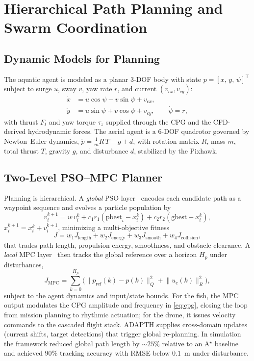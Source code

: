 \documentclass[journal]{IEEEtran}
\begin{document}
\section{Hierarchical Path Planning and Swarm Coordination}
\label{sec:planning}

\subsection{Dynamic Models for Planning}
The aquatic agent is modeled as a planar 3-DOF body with state
$p=[x,\,y,\,\psi]^\top$ subject to surge $u$, sway $v$, yaw rate $r$, and current
$(v_{cx},v_{cy})$:
\begin{align}
\dot{x} &= u\cos\psi - v\sin\psi + v_{cx},\\
\dot{y} &= u\sin\psi + v\cos\psi + v_{cy},\qquad \dot{\psi} = r,
\end{align}
with thrust $F_t$ and yaw torque $\tau_z$ supplied through the CPG and the
CFD-derived hydrodynamic forces. The aerial agent is a 6-DOF quadrotor governed
by Newton--Euler dynamics, $\ddot{p} = \tfrac{1}{m}R\,T - g + d$, with rotation
matrix $R$, mass $m$, total thrust $T$, gravity $g$, and disturbance $d$,
stabilized by the Pixhawk.

\subsection{Two-Level PSO--MPC Planner}
Planning is hierarchical. A \emph{global} PSO layer~\cite{kennedy1995particle}
encodes each candidate path as a waypoint sequence and evolves a particle
population by
\begin{equation}
v_i^{k+1} = w\,v_i^{k} + c_1 r_1(\mathrm{pbest}_i - x_i^{k})
          + c_2 r_2(\mathrm{gbest} - x_i^{k}),
\end{equation}
$x_i^{k+1}=x_i^{k}+v_i^{k+1}$, minimizing a multi-objective fitness
\begin{equation}
J = w_1 J_{\mathrm{length}} + w_2 J_{\mathrm{energy}}
  + w_3 J_{\mathrm{smooth}} + w_4 J_{\mathrm{collision}},
\label{eq:psocost}
\end{equation}
that trades path length, propulsion energy, smoothness, and obstacle clearance.
A \emph{local} MPC layer~\cite{mayne2000constrained,yan2022bionic} then tracks the
global reference over a horizon $H_p$ under disturbances,
\begin{equation}
J_{\mathrm{MPC}} = \sum_{k=0}^{H_p}
\Big(\lVert p_{\mathrm{ref}}(k) - p(k)\rVert_Q^2 + \lVert u_c(k)\rVert_R^2\Big),
\label{eq:mpc}
\end{equation}
subject to the agent dynamics and input/state bounds. For the fish, the MPC output
modulates the CPG amplitude and frequency in \eqref{eq:cpg}, closing the loop from
mission planning to rhythmic actuation; for the drone, it issues velocity commands
to the cascaded flight stack. ADAPTH supplies cross-domain updates (current shifts,
target detections) that trigger global re-planning. In simulation the framework
reduced global path length by $\sim\!25\%$ relative to an A$^\star$ baseline and
achieved $90\%$ tracking accuracy with RMSE below $0.1$~m under disturbance.
\end{document}
